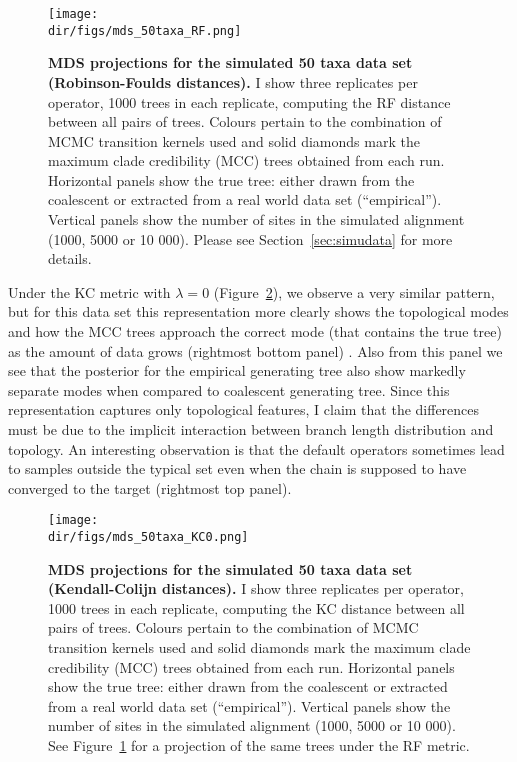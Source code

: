 \begin{figure}[!ht]
\begin{center}
\texttt{[image: \\dir/figs/mds\_50taxa\_RF.png]} 
\end{center}
 \caption[MDS projections for the simulated 50 taxa data set (Robinson-Foulds distances).]{\textbf{MDS projections for the simulated 50 taxa data set (Robinson-Foulds distances).}
  I show three replicates per operator, 1000 trees in each replicate, computing the RF distance between all pairs of trees.
 Colours pertain to the combination of MCMC transition kernels used and solid diamonds mark the maximum clade credibility (MCC) trees obtained from each run.
 Horizontal panels show the true tree: either drawn from the coalescent or extracted from a real world data set (``empirical'').
 Vertical panels show the number of sites in the simulated alignment (1000, 5000 or 10 000).
 Please see Section~\ref{sec:simudata} for more details.
 }
 \label{fig:mds_50taxa_RF}
\end{figure}

Under the KC metric with $\lambda = 0$ (Figure~\ref{fig:mds_50taxa_KC0}), we observe a very similar pattern, but for this data set this representation more clearly shows the topological modes and how the MCC trees approach the correct mode (that contains the true tree) as the amount of data grows (rightmost bottom panel) .
Also from this panel we see that the posterior for the empirical generating tree also show markedly separate modes when compared to coalescent generating tree.
Since this representation captures only topological features, I claim that the differences must be due to the implicit interaction between branch length distribution and topology. 
An interesting observation is that the default operators sometimes lead to samples outside the typical set even when the chain is supposed to have converged to the target (rightmost top panel).
\begin{figure}[!ht]
\begin{center}
\texttt{[image: \\dir/figs/mds\_50taxa\_KC0.png]} 
\end{center}
 \caption[MDS projections for the simulated 50 taxa data set (Kendall-Colijn distances).]{\textbf{MDS projections for the simulated 50 taxa data set (Kendall-Colijn distances).}
  I show three replicates per operator, 1000 trees in each replicate, computing the KC distance between all pairs of trees.
 Colours pertain to the combination of MCMC transition kernels used and solid diamonds mark the maximum clade credibility (MCC) trees obtained from each run.
 Horizontal panels show the true tree: either drawn from the coalescent or extracted from a real world data set (``empirical'').
 Vertical panels show the number of sites in the simulated alignment (1000, 5000 or 10 000).
 See Figure~\ref{fig:mds_50taxa_RF} for a projection of the same trees under the RF metric.
 }
\label{fig:mds_50taxa_KC0}
\end{figure}

